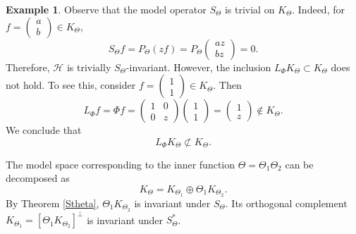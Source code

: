 \documentclass{amsart}
\theoremstyle{definition}
\newtheorem{ex}[thm]{Example}
\newcommand{\hsp}{\mathcal{H}}
\begin{document}
\begin{ex}
Observe that the model operator $S_{\Theta}$ is trivial on $K_{\Theta}$. 
Indeed, for $f=\begin{pmatrix}
    a\\
    b
\end{pmatrix}\in K_{\Theta}$, %
$$S_{\Theta}f=P_{\Theta}(zf)=P_{\Theta}\begin{pmatrix}
    az\\
    bz
\end{pmatrix}=0.$$ %
Therefore,
$\hsp$ is trivially $S_{\Theta}$-invariant. However, the inclusion $L_{\Phi}K_{\Theta}\subset K_{\Theta}$ does not hold. To see this, consider $f=\begin{pmatrix}
    1\\
    1
\end{pmatrix}\in K_{\Theta}$. Then
$$L_{\Phi}f=\Phi f=\begin{pmatrix}
    1&0\\
    0&z
\end{pmatrix}\begin{pmatrix}
    1\\
    1
\end{pmatrix}=\begin{pmatrix}
    1\\
    z
\end{pmatrix}\notin K_{\Theta}.$$ We conclude that
$$L_{\Phi}K_{\Theta}\not\subset K_{\Theta}.$$
\end{ex}
\medskip

The model space corresponding to the inner function $\Theta=\Theta_1 \Theta_2$ can be decomposed as $$K_\Theta=K_{\Theta_1}\oplus \Theta_1 K_{\Theta_2}.$$ By Theorem \ref{Stheta}, $\Theta_1 K_{\Theta_2}$ is invariant under $S_{\Theta}$. Its orthogonal complement $K_{\Theta_1}=[\Theta_1 K_{\Theta_2}]^{\perp}$ is invariant under  $S^*_\Theta$. 
\end{document}
